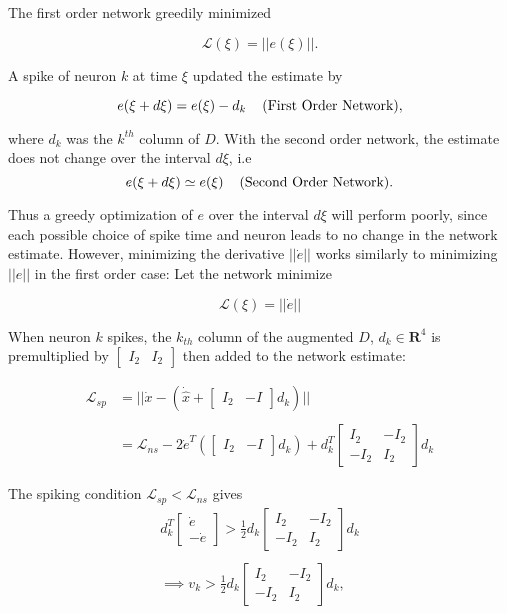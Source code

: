 \begin{itemize}
The first order network greedily minimized 

$$
\mathcal{L}(\xi) = ||e(\xi)||.
$$

A spike of neuron $k$ at time $\xi$ updated the estimate by 

$$
e(\xi + d\xi) = e(\xi) - d_k \hspace{4mm} \text{(First Order Network)},
$$

where $d_k$ was the $k^{th}$ column of $D$. With the second order network, the estimate does not change over the interval $d\xi$, i.e
$$
e(\xi + d\xi) \simeq e(\xi) \hspace{4mm} \text{(Second Order Network)}.
$$

Thus a greedy optimization of $e$ over the interval $d\xi$ will perform poorly, since each possible choice of spike time and neuron leads to no change in the network estimate. However, minimizing the derivative $||\dot{e}||$ works similarly to minimizing $||e||$ in the first order case: Let the network minimize

$$
\mathcal{L}(\xi) = ||\dot{e}||
$$

When neuron $k$ spikes, the $k_{th}$ column of the augmented $D$, $d_k \in \mathbf{R}^{4}$ is premultiplied by $\begin{bmatrix} I_2 & I_2\end{bmatrix}$ then added to the network estimate:

\begin{align*}
\mathcal{L}_{sp} &= ||\dot{x} - \left( \dot{\hat{x}} + 
\begin{bmatrix}
I_2& -I
\end{bmatrix}
d_k
\right)
||
\\
\\
&=
\mathcal{L}_{ns} - 2 \dot{e}^T\left(\begin{bmatrix}
I_2& -I
\end{bmatrix}
d_k
\right) + d_k^T \begin{bmatrix}
I_2 & -I_2 \\
-I_2 & I_2
\end{bmatrix}
d_k
\end{align*}


The spiking condition $\mathcal{L}_{sp} < \mathcal{L}_{ns}$ gives 
\begin{align*}
d_k^T \begin{bmatrix}
\dot{e}
\\
-\dot{e}
\end{bmatrix} > 
\frac{1}{2}
d_k
\begin{bmatrix}
I_2& -I_2
\\
-I_2& I_2
\end{bmatrix}
d_k
\\
\\
\implies 
v_k > \frac{1}{2}
d_k
\begin{bmatrix}
I_2& -I_2
\\
-I_2& I_2
\end{bmatrix}
d_k,
\end{align*}


\end{itemize}
